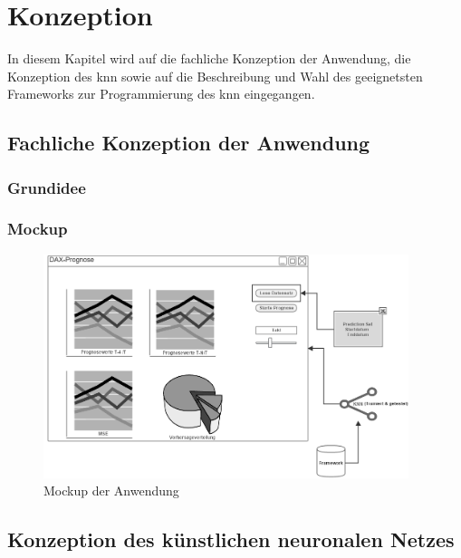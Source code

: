 \chapter{Konzeption}
\label{chapter:Konzeption}
In diesem Kapitel wird auf die fachliche Konzeption der Anwendung, die Konzeption des \ac{knn} sowie auf die Beschreibung und Wahl des geeignetsten Frameworks zur Programmierung des \ac{knn} eingegangen.

\section{Fachliche Konzeption der Anwendung} %
\label{section:Fachliche Konzeption der Anwendung} %

\subsection{Grundidee} %
\label{subsection:Grundidee} %

\subsection{Mockup} %
\label{subsection:Mockup} %

\begin{figure}[htbp]
\centering
		\includegraphics[width=0.95\textwidth]{mockup.PNG}
	\caption{Mockup der Anwendung}
	\label{fig:Mockup der Anwendung}
\end{figure}

\section{Konzeption des künstlichen neuronalen Netzes}
\label{section:Konzeption des künstlichen neuronalen Netzes}

